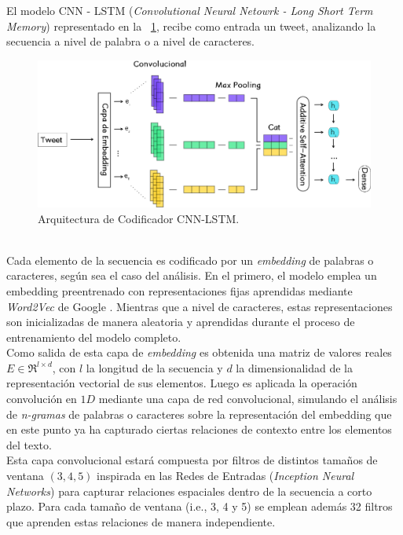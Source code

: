 	El modelo CNN - LSTM (\textit{Convolutional Neural Netowrk - Long Short Term Memory}) representado en la \figurename~\ref{cnn_lstm}, recibe como entrada un tweet, analizando la secuencia a nivel de palabra o a nivel de caracteres.
	\begin{figure}[!thb]
		\begin{center}
			\includegraphics[]{images/cnn_lstm.eps}
		\end{center}	
		\caption[CNN - LSTM]{Arquitectura de Codificador CNN-LSTM.}
		\label{cnn_lstm}
	\end{figure}
	\\
	Cada elemento de la secuencia es codificado por un \textit{embedding} de palabras o caracteres, según sea el caso del análisis. En el primero, el modelo emplea un embedding preentrenado con representaciones fijas aprendidas mediante \textit{Word2Vec} de Google \citep{DBLP:conf/nips/MikolovSCCD13}. Mientras que a nivel de caracteres, estas representaciones son inicializadas de manera aleatoria y aprendidas durante el proceso de entrenamiento del modelo completo.
	\\
	Como salida de esta capa de \textit{embedding} es obtenida una matriz de valores reales $E \in \Re^{l\times d}$, con $l$ la longitud de la secuencia y  $d$ la dimensionalidad de la representación vectorial de sus elementos. Luego es aplicada la operación convolución en $1D$ mediante una capa de red convolucional, simulando el análisis de \textit{n-gramas} de palabras o caracteres sobre la representación del embedding que en este punto ya ha capturado ciertas relaciones de contexto entre los elementos del texto.
	\\
	Esta capa convolucional estará compuesta por filtros de distintos tamaños de ventana $(3, 4, 5)$ inspirada en las Redes de Entradas (\textit{Inception Neural Networks}) \citep{szegedy2014going} para capturar relaciones espaciales dentro de la secuencia a corto plazo. Para cada tamaño de ventana (i.e., 3, 4 y 5) se emplean además 32 filtros que aprenden estas relaciones de manera independiente. 
